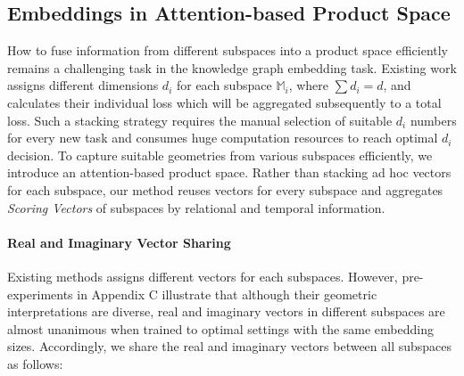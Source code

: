 \documentclass[letterpaper]{article} %
\begin{document}

\subsection{\textbf{Embeddings in Attention-based Product Space}}
How to fuse information from different subspaces into a product space  efficiently remains a challenging task in the knowledge graph embedding task. Existing work \cite{han2020dyernie} assigns different dimensions $d_{i}$ for each subspace $\mathbb{M}_i$, where $\sum{d_{i}} = d $, and calculates their individual loss which will be aggregated subsequently to a total loss. Such a stacking strategy requires the manual selection of suitable $d_{i}$ numbers for every new task and consumes huge computation resources to reach optimal $d_{i}$ decision. 
To capture suitable geometries from various subspaces efficiently, we introduce an attention-based product space. Rather than stacking ad hoc vectors for each subspace, our method reuses vectors for every subspace and aggregates \textit{Scoring Vectors} of subspaces by relational and temporal information.  

\paragraph{\textbf{Real and Imaginary Vector Sharing}} Existing methods \cite{han2020dyernie} assigns different vectors for each subspaces. However, pre-experiments in Appendix C illustrate that although their geometric interpretations are diverse, real and imaginary vectors in different subspaces are almost unanimous when trained to optimal settings with the same embedding sizes. Accordingly, we share the real and imaginary vectors between all subspaces as follows:
\end{document}
